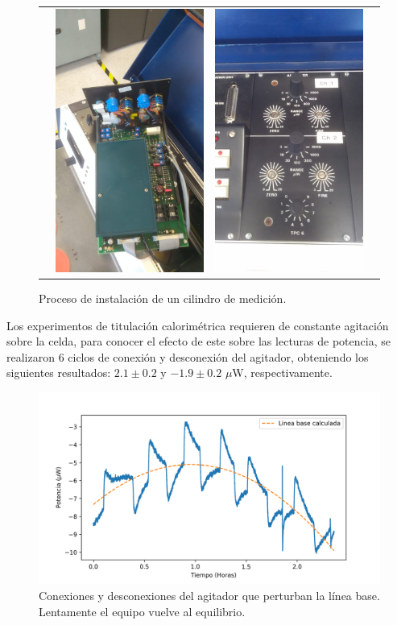 \documentclass[a0]{sciposter}
\begin{document}
\begin{multicols}{3}
\begin{figure}
\begin{tabular}{cccc}
			& \includegraphics[width=0.24\linewidth]{../Tesis/Figures/process/p3} & \includegraphics[width=0.24\linewidth]{../Tesis/Figures/process/p4} \\
		\end{tabular}
		\caption{Proceso de instalación de un cilindro de medición.}
	\end{figure}

	Los experimentos de titulaci\'on calorim\'etrica requieren de constante agitaci\'on sobre la celda, para conocer el efecto de este sobre las lecturas de potencia, se realizaron 6 ciclos de conexi\'on y desconexi\'on del agitador, obteniendo los siguientes resultados: $2.1\pm0.2$ y $-1.9\pm0.2$ $\mu$W, respectivamente.
	\begin{figure}[h]
		\centering
		\includegraphics[width=\linewidth]{../Data/Baselines/motor}
		\caption{Conexiones y desconexiones del agitador que perturban la línea base. Lentamente el equipo vuelve al equilibrio.}
	\end{figure}


\end{multicols}
\end{document}
